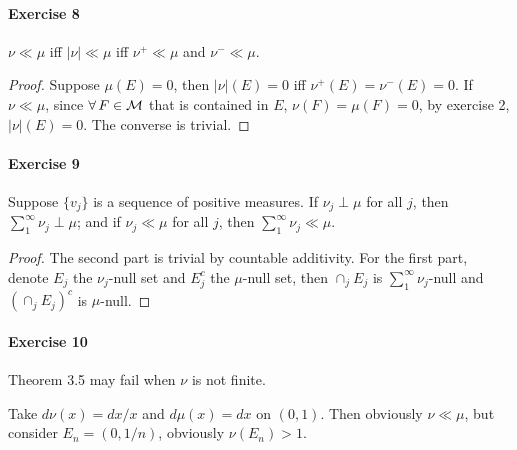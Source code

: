 \paragraph*{Exercise 8}
$\nu\ll\mu$ iff $|\nu|\ll\mu$ iff $\nu^+\ll\mu$ and $\nu^-\ll\mu$.
\begin{proof}
    Suppose $\mu(E)=0$, then $|\nu|(E)=0$ iff $\nu^+(E)=\nu^-(E)=0$. If $\nu\ll\mu$, since $\forall\, F\in\mathcal{M}$ that is contained in $E$, $\nu(F)=\mu(F)=0$, by exercise 2, $|\nu|(E)=0$. The converse is trivial.
\end{proof}
\paragraph*{Exercise 9}
Suppose $\{v_j\}$ is a sequence of positive measures. If $\nu_j\perp\mu$ for all $j$, then $\sum^\infty_1\nu_j\perp\mu$; and if $\nu_j\ll\mu$ for all $j$, then $\sum^\infty_1\nu_j\ll\mu$.
\begin{proof}
    The second part is trivial by countable additivity. For the first part, denote $E_j$ the $\nu_j$-null set and $E_j^c$ the $\mu$-null set, then $\cap_jE_j$ is $\sum^\infty_1\nu_j$-null and $(\cap_jE_j)^c$ is $\mu$-null.
\end{proof}
\paragraph*{Exercise 10}
Theorem 3.5 may fail when $\nu$ is not finite.
\begin{solution}
    Take $d\nu(x)=dx/x$ and $d\mu(x)=dx$ on $(0,1)$. Then obviously $\nu\ll\mu$, but consider $E_n=(0,1/n)$, obviously $\nu(E_n)>1$.
\end{solution}
